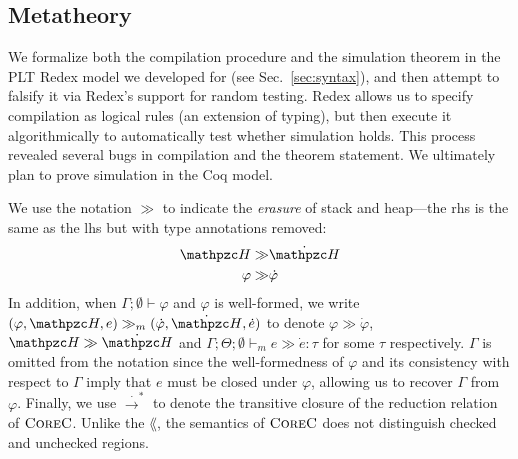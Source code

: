 \subsection{Metatheory}
\label{sec:meta}


We formalize both the compilation procedure and the simulation
theorem in the PLT Redex model we developed for \lang (see Sec.~\ref{sec:syntax}),
and then attempt to falsify it via Redex's support for random
testing. Redex allows us
  to specify compilation as logical rules (an extension
  of typing), but then execute it algorithmically to
  automatically test whether simulation holds. This process revealed
  several bugs in compilation and the theorem statement.
%
We ultimately plan to prove simulation in the Coq model.

We use the notation $\gg$ to
indicate the \emph{erasure} of stack and heap---the rhs is the same as
the lhs but with type annotations removed:
\begin{equation*}
  \begin{split}
    \heap  \gg & \dot \heap \\
    \varphi \gg & \dot \varphi
  \end{split}
\end{equation*}
In addition, when $\Gamma;\emptyset\vdash
\varphi$ and $\varphi$ is well-formed, we write $(\varphi,\heap,e) \gg_m (\dot \varphi, \dot \heap,
\dot e)$ to denote $\varphi \gg \dot \varphi$, $\heap \gg \dot \heap$
and $\Gamma;\Theta;\emptyset \vdash_m e \gg \dot e : \tau$ for some $\tau$ respectively. $\Gamma$ is omitted from the notation since the well-formedness of $\varphi$ and its consistency with respect to $\Gamma$ imply that $e$ must be closed under $\varphi$, allowing us to recover $\Gamma$ from $\varphi$.
Finally, we use $\xrightarrow{\cdot}^*$ to denote the transitive closure of the
reduction relation of $\textsc{CoreC}$. Unlike the $\lang$, the semantics of
$\textsc{CoreC}$ does not distinguish checked and unchecked regions.

